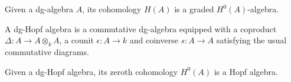 \begin{rem}
Given a dg-algebra $A$, its cohomology $H(A)$ is a graded $H^0(A)$-algebra.
\end{rem}

\begin{defn}
A dg-Hopf algebra is a commutative dg-algebra equipped with a coproduct $\Delta : A \to A \otimes_k A$, a counit $\epsilon : A \to k$ and coinverse $s : A \to A$ satisfying the usual commutative diagrams.
\end{defn}

\begin{rem}
Given a dg-Hopf algebra, its zeroth cohomology $H^0(A)$ is a Hopf algebra.
\end{rem}